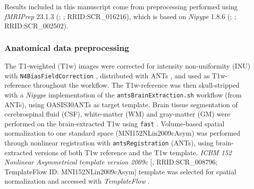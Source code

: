 \documentclass[fleqn,10pt]{wlscirep}
\begin{document}

Results included in this manuscript come from preprocessing performed
using \emph{fMRIPrep} 23.1.3 (\citet{fmriprep1}; \citet{fmriprep2};
RRID:SCR\_016216), which is based on \emph{Nipype} 1.8.6
(\citet{nipype1}; \citet{nipype2}; RRID:SCR\_002502).

\subsubsection*{Anatomical data preprocessing}
The T1-weighted (T1w) images were corrected for intensity non-uniformity (INU) with \texttt{N4BiasFieldCorrection} \citep{n4},
distributed with ANTs \citep[RRID:SCR\_004757]{ants},
and used as T1w-reference throughout the workflow. The T1w-reference was
then skull-stripped with a \emph{Nipype} implementation of the
\texttt{antsBrainExtraction.sh} workflow (from ANTs), using OASIS30ANTs
as target template. Brain tissue segmentation of cerebrospinal fluid
(CSF), white-matter (WM) and gray-matter (GM) were performed on the
brain-extracted T1w using \texttt{fast} \citep[FSL,
RRID:SCR\_002823,][]{fsl_fast}. Volume-based spatial normalization to
one standard space (MNI152NLin2009cAsym) was performed through nonlinear
registration with \texttt{antsRegistration} (ANTs),
using brain-extracted versions of both T1w reference and the T1w
template. \emph{ICBM 152 Nonlinear Asymmetrical
template version 2009c} {[}\citet{mni152nlin2009casym},
RRID:SCR\_008796; TemplateFlow ID: MNI152NLin2009cAsym{]} template was selected for spatial
normalization and accessed with \emph{TemplateFlow}
\citep[23.0.0,][]{ciric2022templateflow}.
\end{document}

